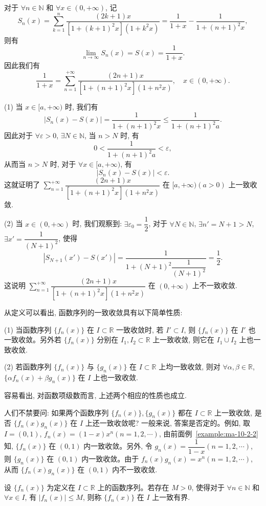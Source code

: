 \begin{solve}
对于 $\forall n\in\mathbb N$ 和 $\forall x\in(0,+\infty)$, 记
\[
  S_n(x)=\sum_{k=1}^n\frac{(2k+1)x}{[1+(k+1)^2x](1+k^2x)}
  =\frac1{1+x}-\frac1{1+(n+1)^2x},
\]
则有
\[
  \lim_{n\to\infty}S_n(x)=S(x)=\frac1{1+x}.
\]
因此我们有
\[
  \frac1{1+x}=\sum_{n=1}^{+\infty}\frac{(2n+1)x}{[1+(n+1)^2x](1+n^2x)},\quad x\in(0,+\infty).
\]

(1) 当 $x\in[a,+\infty)$ 时, 我们有
\[
  |S_n(x)-S(x)|=\frac1{1+(n+1)^2x}\leq\frac1{1+(n+1)^2a}.
\]
因此对于 $\forall\varepsilon>0$, $\exists N\in\mathbb N$, 当 $n>N$ 时, 有
\[
  0<\frac1{1+(n+1)^2a}<\varepsilon,
\]
从而当 $n>N$ 时, 对于 $\forall x\in[a,+\infty)$, 有
\[
  |S_n(x)-S(x)|<\varepsilon.
\]
这就证明了 $\sum\limits_{n=1}^{+\infty}\dfrac{(2n+1)x}{[1+(n+1)^2x](1+n^2x)}$ 在 $[a,+\infty)(a>0)$ 上一致收敛.

(2) 当 $x\in(0,+\infty)$ 时, 我们观察到: $\exists\varepsilon_0=\dfrac12$, 对于 $\forall N\in\mathbb N$, $\exists n'=N+1>N$, $\exists x'=\dfrac1{(N+1)^2}$, 使得
\[
  |S_{N+1}(x')-S(x')|=\frac1{1+(N+1)^2\dfrac1{(N+1)^2}}=\frac12.
\]
这说明 $\sum\limits_{n=1}^{+\infty}\dfrac{(2n+1)x}{[1+(n+1)^2x](1+n^2x)}$ 在 $(0,+\infty)$ 上不一致收敛.

从定义可以看出, 函数序列的一致收敛具有以下简单性质:

(1) 当函数序列 $\{f_n(x)\}$ 在 $I\subset\mathbb R$ 一致收敛时, 若 $I'\subset I$, 则 $\{f_n(x)\}$ 在 $I'$ 也一致收敛。另外若 $\{f_n(x)\}$ 分别在 $I_1,I_2\subset\mathbb R$ 上一致收敛, 则它在 $I_1\cup I_2$ 上也一致收敛.

(2) 若函数序列 $\{f_n(x)\}$ 与 $\{g_n(x)\}$ 在 $I\subset\mathbb R$ 上均一致收敛, 则对 $\forall\alpha,\beta\in\mathbb R$, $\{\alpha f_n(x)+\beta g_n(x)\}$ 在 $I$ 上也一致收敛.

容易看出, 对函数项级数而言, 上述两个相应的性质也成立.

人们不禁要问: 如果两个函数序列 $\{f_n(x)\},\{g_n(x)\}$ 都在 $I\subset\mathbb R$ 上一致收敛, 是否 $\{f_n(x)g_n(x)\}$ 在 $I$ 上还一致收敛呢? 一般来说, 答案是否定的。例如, 取 $I=(0,1)$, $f_n(x)=(1-x)x^n(n=1,2,\cdots)$, 由前面例~\ref{example:ma-10-2-2} 知, $\{f_n(x)\}$ 在 $(0,1)$ 内一致收敛。另外, 令 $g_n(x)=\dfrac1{1-x}(n=1,2,\cdots)$, 则 $\{g_n(x)\}$ 在 $(0,1)$ 内一致收敛。由于 $f_n(x)g_n(x)=x^n(n=1,2,\cdots)$, 从而 $\{f_n(x)g_n(x)\}$ 在 $(0,1)$ 内不一致收敛.
\end{solve}


\begin{definition}\label{definition:ma-10-2-3}
设 $\{f_n(x)\}$ 为定义在 $I\subset\mathbb R$ 上的函数序列。若存在 $M>0$, 使得对于 $\forall n\in\mathbb N$ 和 $\forall x\in I$, 有 $|f_n(x)|\leq M$, 则称 $\{f_n(x)\}$ 在 $I$ 上一致有界.
\end{definition}

